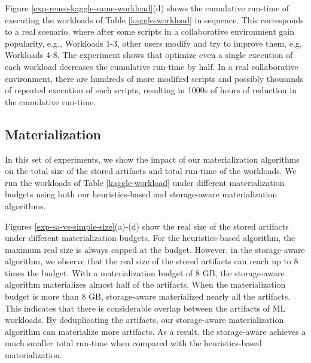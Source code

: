 Figure \ref{exp-reuse-kaggle-same-workload}(d) shows the cumulative run-time of executing the workloads of Table \ref{kaggle-workload} in sequence.
This corresponds to a real scenario, where after some scripts in a collaborative environment gain popularity, e.g., Workloads 1-3, other users modify and try to improve them, e.g, Workloads 4-8.
The experiment shows that optimize even a single execution of each workload decreases the cumulative run-time by half.
In a real collaborative environment, there are hundreds of more modified scripts and possibly thousands of repeated execution of such scripts, resulting in 1000s of hours of reduction in the cumulative run-time.

\subsection{Materialization}
In this set of experiments, we show the impact of our materialization algorithms on the total size of the stored artifacts and total run-time of the workloads.
We run the workloads of Table \ref{kaggle-workload} under different materialization budgets using both our heuristics-based and storage-aware materialization algorithms.

Figures \ref{exp-sa-vs-simple-size}(a)-(d) show the real size of the stored artifacts under different materialization budgets.
For the heuristics-based algorithm, the maximum real size is always capped at the budget.
However, in the storage-aware algorithm, we observe that the real size of the stored artifacts can reach up to 8 times the budget.
With a materialization budget of 8 GB, the storage-aware algorithm materializes almost half of the artifacts.
When the materialization budget is more than 8 GB, storage-aware materialized nearly all the artifacts.
This indicates that there is considerable overlap between the artifacts of ML workloads.
By deduplicating the artifacts, our storage-aware materialization algorithm can materialize more artifacts.
As a result, the storage-aware achieves a much smaller total run-time when compared with the heuristics-based materialization.

